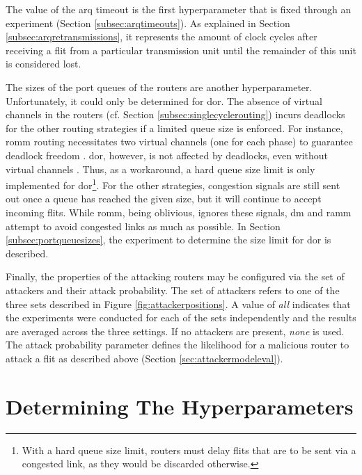 The value of the \gls{arq} timeout is the first hyperparameter that is fixed through an experiment (Section \ref{subsec:arqtimeouts}). As explained in
Section \ref{subsec:arqretransmissions}, it represents the amount of clock cycles after receiving a flit from a particular transmission unit until the
remainder of this unit is considered lost.

The sizes of the port queues of the routers are another hyperparameter. Unfortunately, it could only be determined for \gls{dor}. The absence of
virtual channels in the routers (cf. Section \ref{subsec:singlecyclerouting}) incurs deadlocks for the other routing strategies if a limited queue
size is enforced. For instance, \gls{romm} routing necessitates two virtual channels (one for each phase) to guarantee deadlock freedom
\cite[4]{nesson95romm}. \Gls{dor}, however, is not affected by deadlocks, even without virtual channels \cite[9]{ni93routingsurvey}. Thus, as a
workaround, a hard queue size limit is only implemented for \gls{dor}\footnote{With a hard queue size limit, routers must delay flits that are
to be sent via a congested link, as they would be discarded otherwise.}. For the other strategies, congestion signals are still sent out once a queue
has reached the given size, but it will continue to accept incoming flits. While \gls{romm}, being oblivious, ignores these signals, \gls{dm} and
\gls{ramm} attempt to avoid congested links as much as possible. In Section \ref{subsec:portqueuesizes}, the experiment to determine the size limit
for \gls{dor} is described.

Finally, the properties of the attacking routers may be configured via the set of attackers and their attack probability. The set of attackers refers
to one of the three sets described in Figure \ref{fig:attackerpositions}. A value of \textit{all} indicates that the experiments were conducted for
each of the sets independently and the results are averaged across the three settings. If no attackers are present, \textit{none} is used. The attack
probability parameter defines the likelihood for a malicious router to attack a flit as described above (Section \ref{sec:attackermodeleval}).

\section{Determining The Hyperparameters}\label{sec:hyperparamseval}
